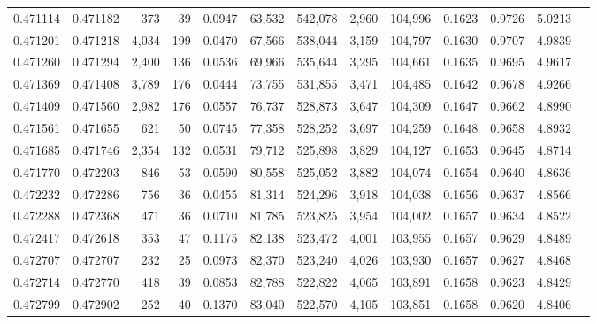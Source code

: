 \begin{tabular}{rrrrrrrrrrrrr}
0.471114 & 0.471182 &   373 &    39 &                                     0.0947 &  63,532 & 542,078 &   2,960 & 104,996 & 0.1623 & 0.9726 & 5.0213 \\
0.471201 & 0.471218 & 4,034 &   199 &                                     0.0470 &  67,566 & 538,044 &   3,159 & 104,797 & 0.1630 & 0.9707 & 4.9839 \\
0.471260 & 0.471294 & 2,400 &   136 &                                     0.0536 &  69,966 & 535,644 &   3,295 & 104,661 & 0.1635 & 0.9695 & 4.9617 \\
0.471369 & 0.471408 & 3,789 &   176 &                                     0.0444 &  73,755 & 531,855 &   3,471 & 104,485 & 0.1642 & 0.9678 & 4.9266 \\
0.471409 & 0.471560 & 2,982 &   176 &                                     0.0557 &  76,737 & 528,873 &   3,647 & 104,309 & 0.1647 & 0.9662 & 4.8990 \\
0.471561 & 0.471655 &   621 &    50 &                                     0.0745 &  77,358 & 528,252 &   3,697 & 104,259 & 0.1648 & 0.9658 & 4.8932 \\
0.471685 & 0.471746 & 2,354 &   132 &                                     0.0531 &  79,712 & 525,898 &   3,829 & 104,127 & 0.1653 & 0.9645 & 4.8714 \\
0.471770 & 0.472203 &   846 &    53 &                                     0.0590 &  80,558 & 525,052 &   3,882 & 104,074 & 0.1654 & 0.9640 & 4.8636 \\
0.472232 & 0.472286 &   756 &    36 &                                     0.0455 &  81,314 & 524,296 &   3,918 & 104,038 & 0.1656 & 0.9637 & 4.8566 \\
0.472288 & 0.472368 &   471 &    36 &                                     0.0710 &  81,785 & 523,825 &   3,954 & 104,002 & 0.1657 & 0.9634 & 4.8522 \\
0.472417 & 0.472618 &   353 &    47 &                                     0.1175 &  82,138 & 523,472 &   4,001 & 103,955 & 0.1657 & 0.9629 & 4.8489 \\
0.472707 & 0.472707 &   232 &    25 &                                     0.0973 &  82,370 & 523,240 &   4,026 & 103,930 & 0.1657 & 0.9627 & 4.8468 \\
0.472714 & 0.472770 &   418 &    39 &                                     0.0853 &  82,788 & 522,822 &   4,065 & 103,891 & 0.1658 & 0.9623 & 4.8429 \\
0.472799 & 0.472902 &   252 &    40 &                                     0.1370 &  83,040 & 522,570 &   4,105 & 103,851 & 0.1658 & 0.9620 & 4.8406 \\

\end{tabular}
